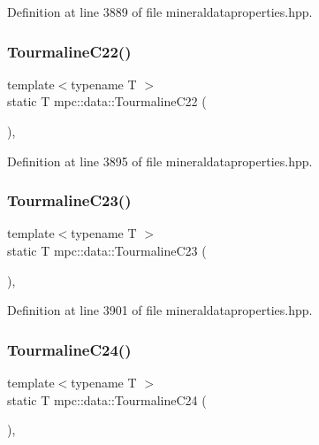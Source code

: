 Definition at line 3889 of file mineraldataproperties.\+hpp.

\mbox{\label{namespacempc_1_1data_a8ec17ca33494126264ce4ceca7003ce2}} 
\subsubsection{\texorpdfstring{Tourmaline\+C22()}{TourmalineC22()}}
{\footnotesize\ttfamily template$<$typename T $>$ \\
static T mpc\+::data\+::\+Tourmaline\+C22 (\begin{DoxyParamCaption}{ }\end{DoxyParamCaption})\hspace{0.3cm}{\ttfamily [inline]}, {\ttfamily [static]}}



Definition at line 3895 of file mineraldataproperties.\+hpp.

\mbox{\label{namespacempc_1_1data_a938050181485b3a2a7cef76b41d434cd}} 
\subsubsection{\texorpdfstring{Tourmaline\+C23()}{TourmalineC23()}}
{\footnotesize\ttfamily template$<$typename T $>$ \\
static T mpc\+::data\+::\+Tourmaline\+C23 (\begin{DoxyParamCaption}{ }\end{DoxyParamCaption})\hspace{0.3cm}{\ttfamily [inline]}, {\ttfamily [static]}}



Definition at line 3901 of file mineraldataproperties.\+hpp.

\mbox{\label{namespacempc_1_1data_ae46c1521d3c64f4539d09ec503d15f98}} 
\subsubsection{\texorpdfstring{Tourmaline\+C24()}{TourmalineC24()}}
{\footnotesize\ttfamily template$<$typename T $>$ \\
static T mpc\+::data\+::\+Tourmaline\+C24 (\begin{DoxyParamCaption}{ }\end{DoxyParamCaption})\hspace{0.3cm}{\ttfamily [inline]}, {\ttfamily [static]}}



